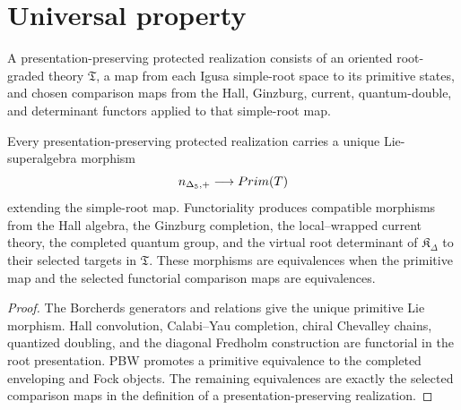 \chapter{Universal property}
A presentation-preserving protected realization consists of an oriented root-graded theory $\mathfrak T$, a map from each Igusa simple-root space to its primitive states, and chosen comparison maps from the Hall, Ginzburg, current, quantum-double, and determinant functors applied to that simple-root map.

\begin{theorem}
Every presentation-preserving protected realization carries a unique Lie-superalgebra morphism
\[
 {n_{\Delta_5,+}}\longrightarrow Prim(T)
\]
extending the simple-root map.  Functoriality produces compatible morphisms from the Hall algebra, the Ginzburg completion, the local--wrapped current theory, the completed quantum group, and the virtual root determinant of $\mathfrak K_\Delta$ to their selected targets in $\mathfrak T$.  These morphisms are equivalences when the primitive map and the selected functorial comparison maps are equivalences.
\end{theorem}
\begin{proof}
The Borcherds generators and relations give the unique primitive Lie morphism.  Hall convolution, Calabi--Yau completion, chiral Chevalley chains, quantized doubling, and the diagonal Fredholm construction are functorial in the root presentation.  PBW promotes a primitive equivalence to the completed enveloping and Fock objects.  The remaining equivalences are exactly the selected comparison maps in the definition of a presentation-preserving realization.
\end{proof}

